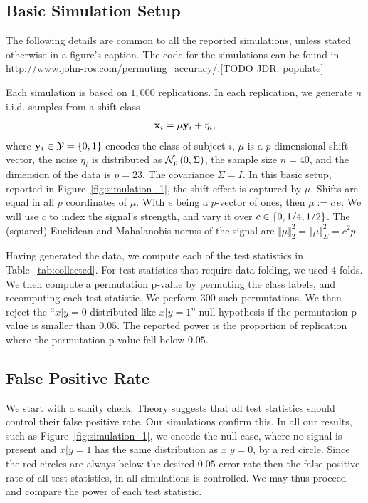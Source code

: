 \documentclass[12pt,a4paper]{article}
\begin{document}
\subsection{Basic Simulation Setup}
\label{sec:simulation_details}

The following details are common to all the reported simulations, unless stated otherwise in a figure's caption. 
The \R code for the simulations can be found in \url{http://www.john-ros.com/permuting_accuracy/}.[TODO JDR: populate]

Each simulation is based on $1,000$ replications. 
In each replication, we generate $n$ i.i.d. samples from a shift class 
\begin{align}
\label{eq:distribution}
	\mathbf{x}_i = \mu \mathbf{y}_i + \eta_i,
\end{align}
where $\mathbf{y}_i \in \mathcal{Y}=\{ 0,1 \}$ encodes the class of subject $i$, $\mu$ is a $p$-dimensional shift vector, the noise $\eta_i$ is distributed as $\mathcal{N}_{p}\left(0,\Sigma\right)$, the sample size $n=40$, and the dimension of the data is $p=23$. 
The covariance $\Sigma=I$. 
In this basic setup, reported in Figure~\ref{fig:simulation_1}, the shift effect is captured by $\mu$. 
Shifts are equal in all $p$ coordinates of $\mu$.
With $e$ being a $p$-vector of ones, then $\mu:=c \, e$. 
We will use $c$ to index the signal's strength, and vary it over $c \in \{ 0,1/4,1/2 \}$.
The (squared) Euclidean and Mahalanobis norms of the signal are $\Vert \mu \Vert_2^2=\Vert \mu \Vert_\Sigma^2=c^2 p$.


Having generated the data, we compute each of the test statistics in Table~\ref{tab:collected}.
For test statistics that require data folding, we used $4$ folds. 
We then compute a permutation p-value by permuting the class labels, and recomputing each test statistic. 
We perform $300$ such permutations. 
We then reject the ``$x|y=0$ distributed like $x|y=1$'' null hypothesis if the permutation p-value is smaller than $0.05$.
The reported power is the proportion of replication where the permutation p-value fell below $0.05$.



\subsection{False Positive Rate}
\label{sec:type_i}

We start with a sanity check. 
Theory suggests that all test statistics should control their false positive rate. 
Our simulations confirm this.
In all our results, such as Figure~\ref{fig:simulation_1}, we encode the null case, where no signal is present and $x|y=1$ has the same distribution as $x|y=0$, by a red circle. 
Since the red circles are always below the desired $0.05$ error rate then the false positive rate of all test statistics, in all simulations is controlled. 
We may thus proceed and compare the power of each test statistic. 
\end{document}
